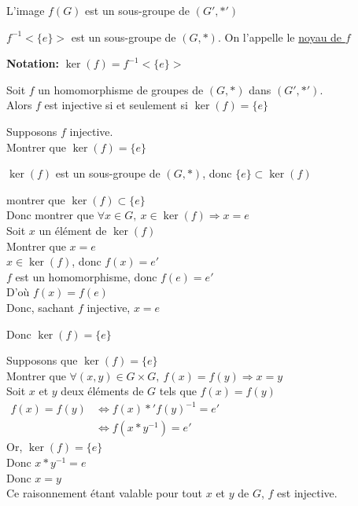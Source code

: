 \documentclass[12pt,twoside,a4paper]{article}
\begin{document}
			\begin{coro}
				\begin{liste}
					\item L'image $f(G)$ est un sous-groupe de $(G',*')$
					\item $f^{-1}<\{e\}>$ est un sous-groupe de $(G,*)$. On l'appelle le \underline{noyau de $f$}
				\end{liste}
			\end{coro}
			\begin{flushleft}
				\textbf{Notation:} $\ker(f)=f^{-1}<\{e\}>$
			\end{flushleft}
			\begin{prop}
				Soit $f$ un homomorphisme de groupes de $(G,*)$ dans $(G',*')$.\\
				Alors $f$ est injective si et seulement si $\ker(f)=\{e\}$
			\end{prop}
\newpage
			\begin{preuve}
				\begin{liste}
					\item[\cercle1]Supposons $f$ injective.\\
						Montrer que $\ker(f)=\{e\}$\\
						\begin{liste}
							\item $\ker(f)$ est un sous-groupe de $(G,*)$, donc $\{e\}\subset\ker(f)$
							\item montrer que $\ker(f)\subset \{e\}$\\
								Donc montrer que $\forall x\in G,\ x\in\ker(f)\Rightarrow x=e$\\
								Soit $x$ un \'el\'ement de $\ker(f)$\\
								Montrer que $x=e$\\
								$x\in\ker(f)$, donc $f(x)=e'$\\
								$f$ est un homomorphisme, donc $f(e)=e'$\\
								D'o\`u $f(x)=f(e)$\\
								Donc, sachant $f$ injective, $x=e$
						\end{liste}
						Donc $\ker(f)=\{e\}$
					\item[\cercle2]Supposons que $\ker(f)=\{e\}$\\
						Montrer que $\forall(x,y)\in G\times G,\ f(x)=f(y)\Rightarrow x=y$\\
						Soit $x$ et $y$ deux \'el\'ements de $G$ tels que $f(x)=f(y)$\\
						$\begin{aligned}
							f(x)=f(y)&\iff f(x)*'f(y)^{-1}=e'\\
								&\iff f(x*y^{-1})=e'
						\end{aligned}$\\
						Or, $\ker(f)=\{e\}$\\
						Donc $x*y^{-1}=e$\\
						Donc $x=y$\\
						Ce raisonnement \'etant valable pour tout $x$ et $y$ de $G$, $f$ est injective.
				\end{liste}
			\end{preuve}
\end{document}
